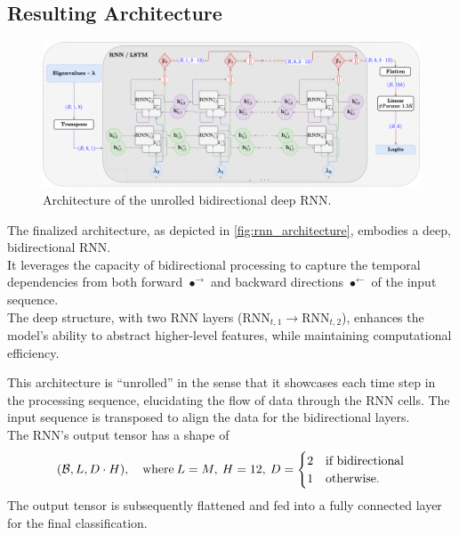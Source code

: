 \subsection{Resulting Architecture}

\begin{figure}[H]
    \centering
    \includegraphics[width=1\textwidth]{figures/06_ModelExploration/RNN/rnn.pdf}
    \caption{Architecture of the unrolled bidirectional deep RNN.}
    \label{fig:rnn_architecture}
\end{figure}

The finalized architecture, as depicted in \autoref{fig:rnn_architecture}, embodies a deep, bidirectional RNN. \\
It leverages the capacity of bidirectional processing to capture the temporal dependencies from both forward \( \bullet^{\rightarrow} \)
and backward directions \( \bullet^{\leftarrow} \) of the input sequence.  \\
The deep structure, with two RNN layers (\( \mathrm{RNN}_{t,1} \rightarrow \mathrm{RNN}_{t,2} \)), enhances the model's
ability to abstract higher-level features, while maintaining computational efficiency.

This architecture is ``unrolled'' in the sense that it showcases each time step in the processing sequence, elucidating
the flow of data through the RNN cells. The input sequence is transposed to align the data for the bidirectional layers.\\
The RNN's output tensor has a shape of
\[
    (\mathcal{B}, L, D \cdot H), \quad \text{where}\: L = M, \: H = 12, \: D = \begin{cases}
                                                                    2 & \text{if bidirectional} \\
                                                                    1 & \text{otherwise.}
                                                                \end{cases}
\]
The output tensor is subsequently flattened and fed into a fully connected layer for the final classification. \\

